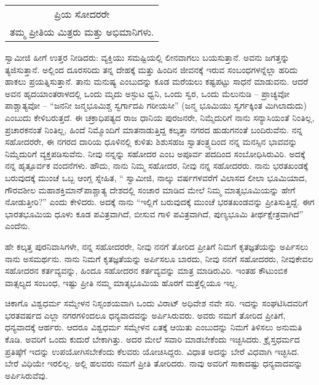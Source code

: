 \begin{longtable}[r]{@{}c@{}}
ಪ್ರಿಯ ಸೋದರರೇ \\
ತಮ್ಮ ಪ್ರೀತಿಯ ಮಿತ್ರರು ಮತ್ತು ಅಭಿಮಾನಿಗಳು. \\
\end{longtable}

ಸ್ವಾಮೀಜಿ ಹೀಗೆ ಉತ್ತರ ನೀಡಿದರು: ವ್ಯಕ್ತಿಯು ಸಮಷ್ಟಿಯಲ್ಲಿ ಲೀನವಾಗಲು ಬಯಸುತ್ತಾನೆ. ಅವನು ಜಗತ್ತನ್ನು ತ್ಯಜಿಸುತ್ತಾನೆ. ಅಲ್ಲಿಂದ ದೂರಸರಿದು ತನ್ನ ದೇಹಕ್ಕೆ ಮತ್ತು ಹಿಂದಿನ ಜೀವನಕ್ಕೆ ಇರುವ ಸಂಬಂಧಗಳನ್ನೆಲ್ಲಾ ಹರಿದು ಹಾಕಲು ಪ್ರಯತ್ನಿಸುತ್ತಾನೆ. ತಾನು ಮನುಷ್ಯ ಎಂಬುದನ್ನು ಕೂಡ ಮರೆಯಲು ಕಷ್ಟಪಟ್ಟು ಸಾಧನೆ ಮಾಡುವನು. ಆದರೆ ಅವನ ಹೃದಯಾಂತರಾಳದಲ್ಲಿ ಒಂದು ಮೃದು ಅಸ್ಫುಟ ಧ್ವನಿ, ಒಂದು ಸ್ವರ, ಒಂದು ಮೆಲುನುಡಿ – ಪ್ರಾಚ್ಯವೋ ಪಾಶ್ಚಾತ್ಯವೋ – “ಜನನೀ ಜನ್ಮಭೂಮಿಶ್ಚ ಸ್ವರ್ಗಾದಪಿ ಗರೀಯಸೀ” (ಜನ್ಮ ಭೂಮಿಯು ಸ್ವರ್ಗಕ್ಕಿಂತ ಮಿಗಿಲಾದುದು) ಎಂಬುದು ಕೇಳಿಬರುತ್ತದೆ. ಈ ಚಕ್ರಾಧಿಪತ್ಯದ ರಾಜ ಧಾನಿಯ ಪುರಜನರೇ, ನಿಮ್ಮೆದುರಿಗೆ ನಾನು ಸನ್ಯಾಸಿಯಂತೆ ನಿಂತಿಲ್ಲ, ಪ್ರಚಾರಕನಂತೆ ನಿಂತಿಲ್ಲ, ಹಿಂದೆ ನಿಮ್ಮೊಂದಿಗೆ ಮಾತನಾಡುತ್ತಿದ್ದ ಕಲ್ಕತ್ತಾ ನಗರದ ಹುಡುಗನಂತೆ ಬಂದಿರುವೆನು. ನನ್ನ ಸಹೋದರರೇ, ಈ ನಗರದ ದಾರಿಯ ಧೂಳಿನಲ್ಲಿ ಕುಳಿತು ಶಿಶುಸಹಜ ಸ್ವಾತಂತ್ರ್ಯದಿಂದ ನನ್ನ ಮನಸ್ಸಿನ ಭಾವವನ್ನು ನಿಮ್ಮೆದುರಿಗೆ ವ್ಯಕ್ತಪಡಿಸುವೆನು. ನೀವು ನನ್ನನ್ನು ಸಹೋದರ ಎಂಬ ಅಪೂರ್ವ ಪದದಿಂದ ಸಂಬೋಧಿಸಿರುವಿರಿ. ಅದಕ್ಕೆ ನನ್ನ ಹೃತ್ಪೂರ್ವಕ ವಂದನೆಗಳು. ಹೌದು, ನಾನು ನಿಮ್ಮ ಸಹೋದರ, ನೀವು ನನ್ನ ಸಹೋದರರು. ನಾನು ಭರತಖಂಡಕ್ಕೆ ಬರುವುದಕ್ಕೆ ಮುಂಚೆ ಒಬ್ಬ ಆಂಗ್ಲ ಸ್ನೇಹಿತ, “ ಸ್ವಾಮೀಜಿ, ನಾಲ್ಕು ವರ್ಷಗಳವರೆಗೆ ವಿಲಾಸದ ಲೀಲಾ ಭೂಮಿಯಾದ, ಗೌರವಶೀಲ ಮಹಾಶಕ್ತಿಮಾನ್​ ಪಾಶ್ಚಾತ್ಯ ದೇಶದಲ್ಲಿ ಸಂಚಾರ ಮಾಡಿದ ಮೇಲೆ ನಿಮ್ಮ ಮಾತೃಭೂಮಿಯನ್ನು ಹೇಗೆ ನೋಡುತ್ತೀರಿ?” ಎಂದು ಕೇಳಿದರು. ಅದಕ್ಕೆ ನಾನು “ಇಲ್ಲಿಗೆ ಬರುವುದಕ್ಕೆ ಮುಂಚೆ ಭರತಖಂಡವನ್ನು ಪ್ರೀತಿಸುತ್ತಿದ್ದೆ. ಈಗ ಭಾರತಭೂಮಿಯ ಧೂಳು ಕೂಡ ಪವಿತ್ರವಾಗಿದೆ, ಬೀಸುವ ಗಾಳಿ ಪವಿತ್ರವಾಗಿದೆ, ಪುಣ್ಯಭೂಮಿ ತೀರ್ಥಕ್ಷೇತ್ರವಾಗಿದೆ” ಎಂದೆನು. 

ಹೇ ಕಲ್ಕತ್ತ ಪುರನಿವಾಸಿಗಳೇ, ನನ್ನ ಸಹೋದರರೇ, ನೀವು ನನಗೆ ತೋರಿದ ಪ್ರೀತಿಗೆ ನಿಮಗೆ ಕೃತಜ್ಞತೆಯನ್ನು ಅರ್ಪಿಸಲು ನಾನು ಅಸಮರ್ಥನು. ನಾನು ನಿಮಗೆ ಕೃತಜ್ಞತೆಯನ್ನು ಅರ್ಪಿಸಲೂ ಬಾರದು, ನೀವು ನನಗೆ ಸಹೋದರರು, ನೀವುಕೇವಲ ಸಹೋದರನ ಕರ್ತವ್ಯವನ್ನು, ಹಿಂದೂ ಸಹೋದರನ ಕರ್ತವ್ಯವನ್ನು ಮಾತ್ರ ಮಾಡಿರುವಿರಿ. ಇಂತಹ ಕೌಟುಂಬಿಕ ವಾತ್ಸಲ್ಯದ ಸಂಬಂಧ, ಇಷ್ಟು ಪ್ರೀತಿ ನಮ್ಮ ಮಾತೃಭೂಮಿಯ ಹೊರಗೆ ಮತ್ತೆಲ್ಲಿಯೂ ಇಲ್ಲ. 

ಚಿಕಾಗೊ ವಿಶ್ವಧರ್ಮ ಸಮ್ಮೇಳನ ನಿಸ್ಸಂಶಯವಾಗಿ ಒಂದು ವಿರಾಟ್​ ಅಧಿವೇಶ ನವೇ ಸರಿ. ಇದನ್ನು ಸಂಘಟಿಸಿದವರಿಗೆ ಭರತವರ್ಷದ ಎಲ್ಲಾ ನಗರಗಳಿಂದಲೂ ಧನ್ಯವಾದವನ್ನು ಅರ್ಪಿಸಿರುವರು. ಅವರು ನಮಗೆ ತೋರಿದ ಪ್ರೀತಿಗೆ, ಧನ್ಯವಾದಕ್ಕೆ ಆರ್ಹರು. ಆದರೂ ವಿಶ್ವಧರ್ಮ ಸಮ್ಮೇಳನ ಏತಕ್ಕೆ ಆಯಿತು ಎಂಬುದನ್ನು ನಿಮಗೆ ತಿಳಿಸಲು ಅನುಮತಿ ಕೊಡಿ. ಅವರಿಗೆ ಒಂದು ಕುದುರೆ ಬೇಕಾಗಿತ್ತು. ಅದರ ಮೇಲೆ ಸವಾರಿ ಮಾಡಬೇಕೆಂದು ಇಚ್ಛಿಸಿದರು. ಕ್ರೈಸ್ತಧರ್ಮದ ಪ್ರತಿಷ್ಠೆಗೆ ಇದನ್ನು ಉಪಯೋಗಿಸಬೇಕೆಂದು ಕೆಲವರು ಯೋಚಿಸಿದ್ದರು. ವಿಧಾತ ಅದನ್ನು ಬೇರೆ ವಿಧವಾಗಿ ಇಚ್ಛಿಸಿದ. ಬೇರೆ ವಿಧಿಯೇ ಇರಲಿಲ್ಲ. ಅಲ್ಲಿ ಹಲವರು ನಮಗೆ ಪ್ರೀತಿ ತೋರಿದರು. ನಾವು ಅವರಿಗೆ ಸಾಕಾದಷ್ಟು ಧನ್ಯವಾದವನ್ನು ಅರ್ಪಿಸಿರುವೆವು. 

